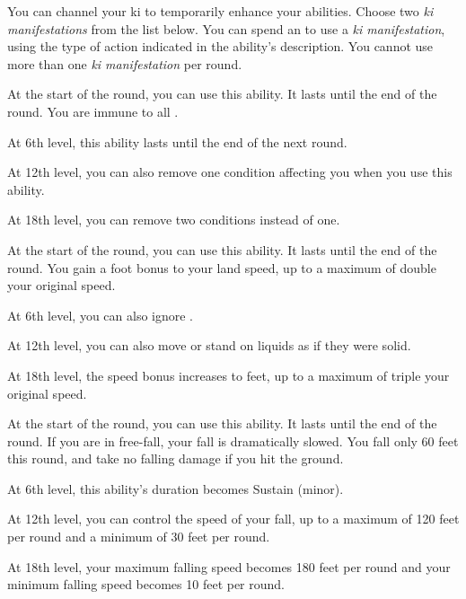         You can channel your ki to temporarily enhance your abilities.
        Choose two \textit{ki manifestations} from the list below.
        You can spend an  to use a \textit{ki manifestation}, using the type of action indicated in the ability's description.
        You cannot use more than one \textit{ki manifestation} per round.
        {
            At the start of the round, you can use this ability.
            It lasts until the end of the round.
            You are immune to all .
            \par At 6th level, this ability lasts until the end of the next round.
            \par At 12th level, you can also remove one condition affecting you when you use this ability.
            \par At 18th level, you can remove two conditions instead of one.

            At the start of the round, you can use this ability.
            It lasts until the end of the round.
            You gain a  foot bonus to your land speed, up to a maximum of double your original speed.
            \par At 6th level, you can also ignore .
            \par At 12th level, you can also move or stand on liquids as if they were solid.
            \par At 18th level, the speed bonus increases to  feet, up to a maximum of triple your original speed.

            At the start of the round, you can use this ability.
            It lasts until the end of the round.
            If you are in free-fall, your fall is dramatically slowed.
            You fall only 60 feet this round, and take no falling damage if you hit the ground.
            \par At 6th level, this ability's duration becomes Sustain (minor).
            \par At 12th level, you can control the speed of your fall, up to a maximum of 120 feet per round and a minimum of 30 feet per round.
            \par At 18th level, your maximum falling speed becomes 180 feet per round and your minimum falling speed becomes 10 feet per round.

}
